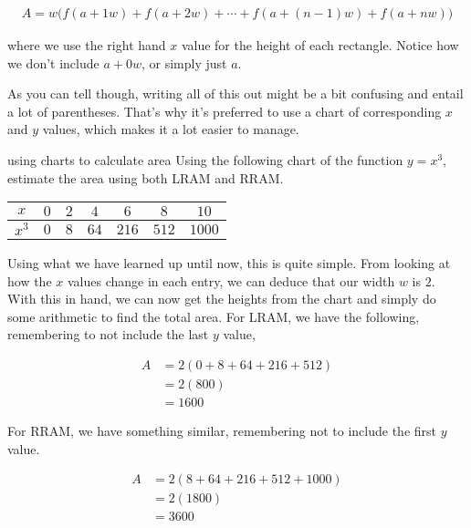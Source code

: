 \begin{align*}
    A = w \Big( f \left( a + 1w \right) + f \left( a + 2w \right) + \cdots + f \left( a + \left( n - 1 \right)w \right) + f \left( a + nw \right) \Big)
\end{align*}

where we use the right hand \( x \) value for the height of each rectangle. Notice how we don't include \( a + 0w \), or simply just \( a \).

As you can tell though, writing all of this out might be a bit confusing and entail a lot of parentheses. That's why it's preferred to use a chart of corresponding \( x \) and \( y \) values, which makes it a lot easier to manage.

\begin{example}{using charts to calculate area}
    Using the following chart of the function \( y = x^3 \), estimate the area using both LRAM and RRAM.

    \begin{center}
    \begin{tabular}{c|c|c|c|c|c|c}
        \( x \) & \( 0 \) & \( 2 \) & \( 4 \) & \( 6 \) & \( 8 \) & \( 10 \) \\
        \hline
        \( x^3 \) & \( 0 \) & \( 8 \) & \( 64 \) & \( 216 \) & \( 512 \) & \( 1000 \) \\
    \end{tabular}
    \end{center}

    \vspace{0.3cm}

    Using what we have learned up until now, this is quite simple. From looking at how the \( x \) values change in each entry, we can deduce that our width \( w \) is \( 2 \). With this in hand, we can now get the heights from the chart and simply do some arithmetic to find the total area. For LRAM, we have the following, remembering to not include the last \( y \) value,

    \begin{align*}
        A &= 2 \left( 0 + 8 + 64 + 216 + 512 \right) \\
          &= 2 \left( 800 \right) \\
          &= 1600
    \end{align*}

    For RRAM, we have something similar, remembering not to include the first \( y \) value.

    \begin{align*}
        A &= 2 \left( 8 + 64 + 216 + 512 + 1000 \right) \\
          &= 2 \left( 1800 \right) \\
          &= 3600
    \end{align*}
\end{example}

